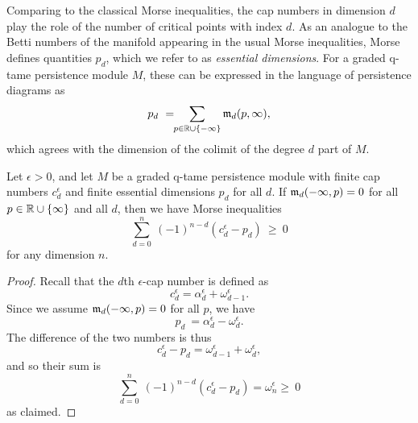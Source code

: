 Comparing to the classical Morse inequalities, the cap numbers in dimension $d$ play the role of the number of critical points with index $d$.
As an analogue to the Betti numbers of the manifold appearing in the usual Morse inequalities, Morse defines quantities $p_{d}$, which we refer to as \emph{essential dimensions}.
For a graded q-tame persistence module $M$, these can be expressed in the language of persistence diagrams as
\[
p_{d} \ = \!\! \sum_{p \in \mathbb{R} \cup \{-\infty\}} \mathfrak{m}_d(p,\infty),
\]
which agrees with the dimension of the colimit of the degree $d$ part of $M$.

\begin{thm} \label{t:inequalities}
	Let $\epsilon > 0$, and let $M$ be a graded q-tame persistence module
	with finite cap numbers $c_{d}^{\epsilon}$ and finite essential dimensions $p_{d}$ for all $d$.
	If $\mathfrak{m}_d(-\infty, p) = 0$ for all $p \in \mathbb{R} \cup \{\infty\}$ and all $d$, then we have Morse inequalities
	\begin{equation} \label{e:morse inequalities}
	\sum_{d=0}^n \ (-1)^{n-d} (c_{d}^{\epsilon} - p_{d}) \ \geq\ 0
	\end{equation}
	for any dimension $n$.
\end{thm}


\begin{proof}
Recall that the $d$th $\epsilon$-cap number is defined as
\[c_{d}^{\epsilon} = \alpha_{d}^{\epsilon} + \omega_{d-1}^{\epsilon}.\] 
Since we assume $\mathfrak{m}_d(-\infty, p) = 0$ for all $p$, we have
	\begin{equation*}
	p_{d} \ = \alpha_{d}^{\epsilon} - \omega_{d}^{\epsilon}.
	\end{equation*}
The difference of the two numbers is thus
\[
c_{d}^{\epsilon} - p_{d} = \omega_{d-1}^{\epsilon} + \omega_{d}^{\epsilon},
\]
and so their sum is
\[
\sum_{d=0}^n \ (-1)^{n-d} (c_{d}^{\epsilon} - p_{d}) = \omega_{n}^{\epsilon} \geq\ 0
\]
as claimed.
\end{proof}

